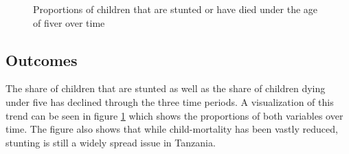 \documentclass[a4paper, 11pt]{article} %
\begin{document}
\begin{figure}[h]
    \centering
    \qquad
    \caption{Proportions of children that are stunted or have died under the age of fiver over time}%
    \label{fig:stunting_dead5_proportion}%
\end{figure}

\subsection*{Outcomes}

The share of children that are stunted as well as the share of children dying under five has declined through the three time periods. A visualization of this trend can be seen in figure \ref{fig:stunting_dead5_proportion} which shows the proportions of both variables over time. The figure also shows that while child-mortality has been vastly reduced, stunting is still a widely spread issue in Tanzania.
\end{document}

